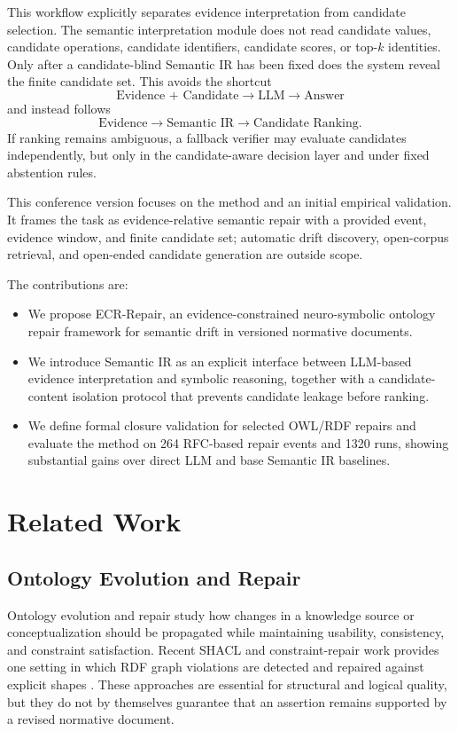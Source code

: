 \documentclass[conference]{IEEEtran}
\begin{document}
This workflow explicitly separates evidence interpretation from candidate selection. The semantic interpretation module does not read candidate values, candidate operations, candidate identifiers, candidate scores, or top-$k$ identities. Only after a candidate-blind Semantic IR has been fixed does the system reveal the finite candidate set. This avoids the shortcut
\[
\text{Evidence + Candidate} \rightarrow \text{LLM} \rightarrow \text{Answer}
\]
and instead follows
\[
\text{Evidence} \rightarrow \text{Semantic IR} \rightarrow \text{Candidate Ranking}.
\]
If ranking remains ambiguous, a fallback verifier may evaluate candidates independently, but only in the candidate-aware decision layer and under fixed abstention rules.

This conference version focuses on the method and an initial empirical validation. It frames the task as evidence-relative semantic repair with a provided event, evidence window, and finite candidate set; automatic drift discovery, open-corpus retrieval, and open-ended candidate generation are outside scope.

The contributions are:
\begin{itemize}
    \item We propose ECR-Repair, an evidence-constrained neuro-symbolic ontology repair framework for semantic drift in versioned normative documents.
    \item We introduce Semantic IR as an explicit interface between LLM-based evidence interpretation and symbolic reasoning, together with a candidate-content isolation protocol that prevents candidate leakage before ranking.
    \item We define formal closure validation for selected OWL/RDF repairs and evaluate the method on 264 RFC-based repair events and 1320 runs, showing substantial gains over direct LLM and base Semantic IR baselines.
\end{itemize}

\section{Related Work}

\subsection{Ontology Evolution and Repair}

Ontology evolution and repair study how changes in a knowledge source or conceptualization should be propagated while maintaining usability, consistency, and constraint satisfaction. Recent SHACL and constraint-repair work provides one setting in which RDF graph violations are detected and repaired against explicit shapes \cite{ahmetaj2022shacl,ahmetaj2025shacl}. These approaches are essential for structural and logical quality, but they do not by themselves guarantee that an assertion remains supported by a revised normative document.
\end{document}
